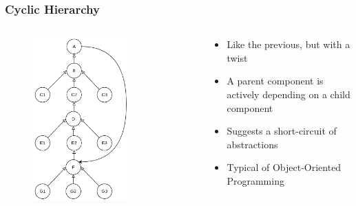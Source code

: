 \documentclass[dvipsnames, 10pt, table]{beamer}
\begin{document}
\begin{frame}
  \frametitle{Cyclic Hierarchy}
  \begin{columns}
    \begin{column}{0.5\textwidth}
      \begin{figure}
        \begin{center}
          \includegraphics[width=0.7\textwidth]{figures/architectural-smells/cyclic-hierarchy.png}
        \end{center}
      \end{figure}
    \end{column}
    \begin{column}{0.5\textwidth}
      \begin{itemize}
        \item Like the previous, but with a twist
        \item A parent component is actively depending on a child component
        \item Suggests a short-circuit of abstractions
        \item Typical of Object-Oriented Programming
      \end{itemize}
    \end{column}
  \end{columns}
\end{frame}
\end{document}
